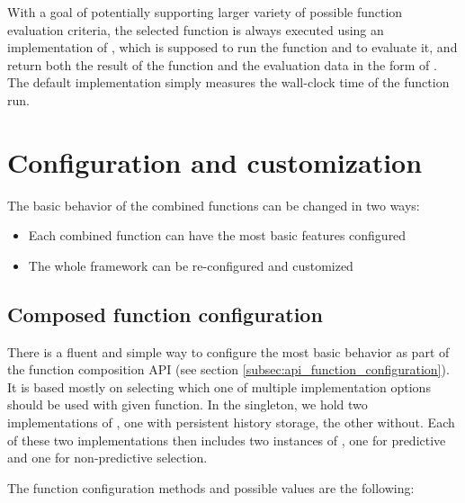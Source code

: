 With a goal of potentially supporting larger variety of possible function evaluation criteria, the selected function is always executed using an implementation of , which is supposed to run the function and to evaluate it, and return both the result of the function and the evaluation data in the form of . The default implementation simply measures the wall-clock time of the function run.

\section{Configuration and customization}

The basic behavior of the combined functions can be changed in two ways:
\begin{itemize}
	\item Each combined function can have the most basic features configured
	\item The whole framework can be re-configured and customized
\end{itemize}

\subsection{Composed function configuration}

There is a fluent and simple way to configure the most basic behavior as part of the function composition API (see section \ref{subsec:api_function_configuration}). It is based mostly on selecting which one of multiple implementation options should be used with given function. In the  singleton, we hold two implementations of , one with persistent history storage, the other without. Each of these two implementations then includes two instances of  , one for predictive and one for non-predictive selection.

The function configuration methods and possible values are the following:

